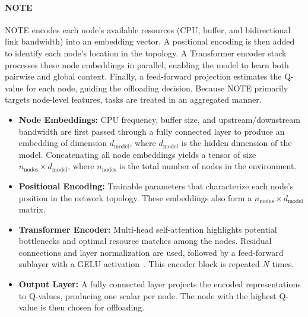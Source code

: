 \documentclass{svproc}
\begin{document}
\paragraph{NOTE}\label{par:note}

NOTE encodes each node’s available resources (CPU, buffer, and bidirectional link bandwidth) into an embedding vector. A positional encoding is then added to identify each node’s location in the topology. A Transformer encoder stack processes these node embeddings in parallel, enabling the model to learn both pairwise and global context. Finally, a feed-forward projection estimates the Q-value for each node, guiding the offloading decision. Because NOTE primarily targets node-level features, tasks are treated in an aggregated manner.

\begin{itemize}
    \item \textbf{Node Embeddings:} CPU frequency, buffer size, and upstream/downstream bandwidth are first passed through a fully connected layer to produce an embedding of dimension \(\displaystyle d_{\text{model}}\), where \(d_{\text{model}}\) is the hidden dimension of the model. Concatenating all node embeddings yields a tensor of size \(\displaystyle n_{\text{nodes}} \times d_{\text{model}}\), where \(n_{\text{nodes}}\) is the total number of nodes in the environment.
    \item \textbf{Positional Encoding:} Trainable parameters that characterize each node’s position in the network topology. These embeddings also form a \(\displaystyle n_{\text{nodes}} \times d_{\text{model}}\) matrix.
    \item \textbf{Transformer Encoder:} Multi-head self-attention highlights potential bottlenecks and optimal resource matches among the nodes. Residual connections and layer normalization are used, followed by a feed-forward sublayer with a GELU activation~\citep{hendrycks2023gaussianerrorlinearunits}. This encoder block is repeated \(N\) times.
    \item \textbf{Output Layer:} A fully connected layer projects the encoded representations to Q-values, producing one scalar per node. The node with the highest Q-value is then chosen for offloading.
\end{itemize}
\end{document}

